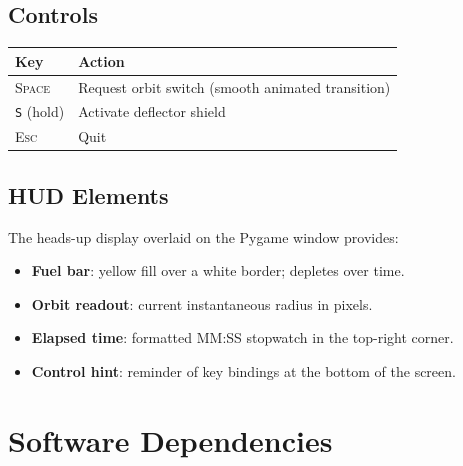 \documentclass[12pt]{article}
\begin{document}
\subsection{Controls}

\begin{center}
    \renewcommand{\arraystretch}{1.3}
    \begin{tabular}{ll}
        \toprule
        Key               & Action                                            \\
        \midrule
        \textsc{Space}    & Request orbit switch (smooth animated transition) \\
        \texttt{S} (hold) & Activate deflector shield                         \\
        \textsc{Esc}      & Quit                                              \\
        \bottomrule
    \end{tabular}
\end{center}

\subsection{HUD Elements}

The heads-up display overlaid on the Pygame window provides:
\begin{itemize}
    \item \textbf{Fuel bar}: yellow fill over a white border; depletes over time.
    \item \textbf{Orbit readout}: current instantaneous radius in pixels.
    \item \textbf{Elapsed time}: formatted MM:SS stopwatch in the top-right corner.
    \item \textbf{Control hint}: reminder of key bindings at the bottom of the screen.
\end{itemize}

\section{Software Dependencies}
\end{document}
